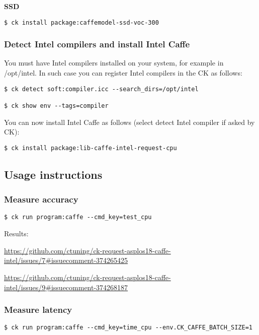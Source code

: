 \documentclass[sigplan]{acmart}
\newenvironment{packed_itemize}{
\begin{itemize}
  \setlength{\itemsep}{1pt}
  \setlength{\parskip}{0pt}
  \setlength{\parsep}{0pt}
}{\end{itemize}}
\begin{document}
\textbf{SSD}

\begin{verbatim}
$ ck install package:caffemodel-ssd-voc-300
\end{verbatim}

\subsubsection{Detect Intel compilers and install Intel Caffe}

You must have Intel compilers installed on your system, for example in /opt/intel.
In such case you can register Intel compilers in the CK as follows:
\begin{verbatim}
$ ck detect soft:compiler.icc --search_dirs=/opt/intel

$ ck show env --tags=compiler
\end{verbatim}

You can now install Intel Caffe as follows (select detect Intel compiler if asked by CK):
\begin{verbatim}
$ ck install package:lib-caffe-intel-request-cpu
\end{verbatim}

\subsection{Usage instructions}

\subsubsection{Measure accuracy}
\begin{verbatim}
$ ck run program:caffe --cmd_key=test_cpu
\end{verbatim}

Results:
\begin{packed_itemize}
 \item \url{https://github.com/ctuning/ck-request-asplos18-caffe-intel/issues/7#issuecomment-374265425}
 \item \url{https://github.com/ctuning/ck-request-asplos18-caffe-intel/issues/9#issuecomment-374268187}
\end{packed_itemize}

\subsubsection{Measure latency}
\begin{verbatim}
$ ck run program:caffe --cmd_key=time_cpu --env.CK_CAFFE_BATCH_SIZE=1
\end{verbatim}
\end{document}
